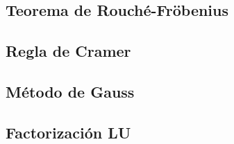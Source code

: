 \documentclass[0_algebra.tex]{subfiles}
\begin{document}
\subsection{Teorema de Rouché-Fröbenius}
\begin{figure}[h]
	\centering
	
\end{figure}
\subsection{Regla de Cramer}
\begin{figure}[h]
	\centering
	
\end{figure}
\subsection{Método de Gauss}
\begin{figure}[h]
	\centering
	
\end{figure}
\subsection{Factorización LU}
\begin{figure}[h]
	\centering
	
\end{figure}
\end{document}
